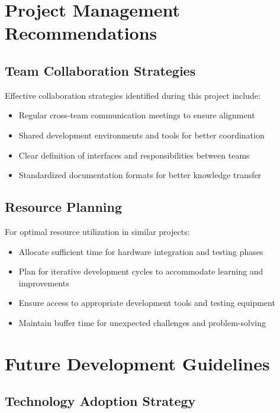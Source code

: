 \documentclass{book}
\begin{document}
\section{Project Management Recommendations}

\subsection{Team Collaboration Strategies}

\par\noindent Effective collaboration strategies identified during this project include:

\begin{itemize}
\item Regular cross-team communication meetings to ensure alignment
\item Shared development environments and tools for better coordination
\item Clear definition of interfaces and responsibilities between teams
\item Standardized documentation formats for better knowledge transfer
\end{itemize}

\subsection{Resource Planning}

\par\noindent For optimal resource utilization in similar projects:

\begin{itemize}
\item Allocate sufficient time for hardware integration and testing phases
\item Plan for iterative development cycles to accommodate learning and improvements
\item Ensure access to appropriate development tools and testing equipment
\item Maintain buffer time for unexpected challenges and problem-solving
\end{itemize}

\section{Future Development Guidelines}

\subsection{Technology Adoption Strategy}
\end{document}
